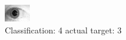 \begin{figure}[h!]
\begin{center}
\includegraphics[width=0.60\columnwidth]{figures/ID1816_class_4_target_3.png}
\end{center}
\caption{ Classification: 4 actual target: 3}
\label{fig:ID1816_class_4_target_3}
\end{figure}
